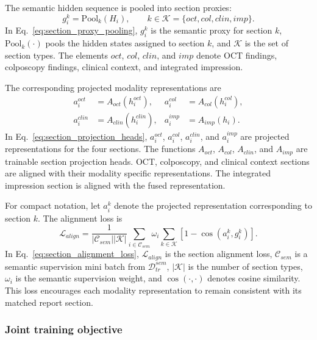 The semantic hidden sequence is pooled into section proxies:
\begin{equation}
g_i^k=\mathrm{Pool}_{k}(H_i),
\qquad
k\in\mathcal{K}=\{oct,col,clin,imp\}.
\label{eq:section_proxy_pooling}
\end{equation}
In Eq.~\eqref{eq:section_proxy_pooling}, $g_i^k$ is the semantic proxy for section $k$, $\mathrm{Pool}_{k}(\cdot)$ pools the hidden states assigned to section $k$, and $\mathcal{K}$ is the set of section types. The elements $oct$, $col$, $clin$, and $imp$ denote OCT findings, colposcopy findings, clinical context, and integrated impression.

The corresponding projected modality representations are
\begin{equation}
\begin{aligned}
a_i^{oct}&=A_{oct}(h_i^{oct}), &
a_i^{col}&=A_{col}(h_i^{col}),\\
a_i^{clin}&=A_{clin}(h_i^{clin}), &
a_i^{imp}&=A_{imp}(h_i).
\end{aligned}
\label{eq:section_projection_heads}
\end{equation}
In Eq.~\eqref{eq:section_projection_heads}, $a_i^{oct}$, $a_i^{col}$, $a_i^{clin}$, and $a_i^{imp}$ are projected representations for the four sections. The functions $A_{oct}$, $A_{col}$, $A_{clin}$, and $A_{imp}$ are trainable section projection heads. OCT, colposcopy, and clinical context sections are aligned with their modality specific representations. The integrated impression section is aligned with the fused representation.

For compact notation, let $a_i^k$ denote the projected representation corresponding to section $k$. The alignment loss is
\begin{equation}
\mathcal{L}_{align}
=
\frac{1}{|\mathcal{C}_{sem}||\mathcal{K}|}
\sum_{i\in\mathcal{C}_{sem}}
\omega_i
\sum_{k\in\mathcal{K}}
\left[1-\cos(a_i^k,g_i^k)\right].
\label{eq:section_alignment_loss}
\end{equation}
In Eq.~\eqref{eq:section_alignment_loss}, $\mathcal{L}_{align}$ is the section alignment loss, $\mathcal{C}_{sem}$ is a semantic supervision mini batch from $\mathcal{D}_{tr}^{sem}$, $|\mathcal{K}|$ is the number of section types, $\omega_i$ is the semantic supervision weight, and $\cos(\cdot,\cdot)$ denotes cosine similarity. This loss encourages each modality representation to remain consistent with its matched report section.

\subsubsection{Joint training objective}
\label{subsubsec:joint_training_objective}

